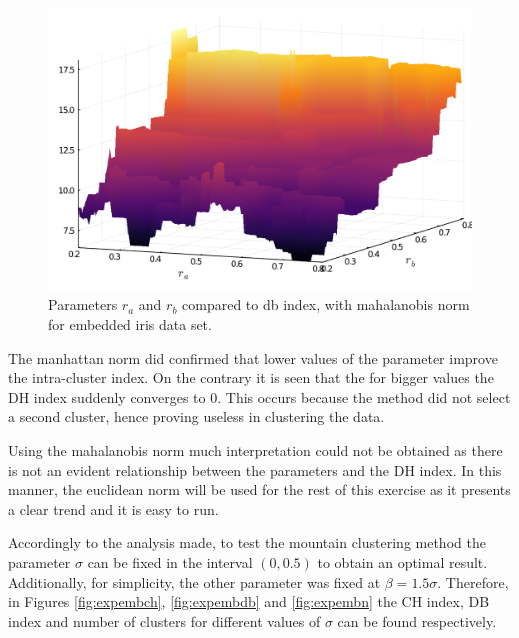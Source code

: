 \documentclass[conference]{IEEEtran}
\theoremstyle{definition}
\theoremstyle{remark}
\theoremstyle{remark}
\begin{document}
\begin{figure}[t]
  \centering
  \includegraphics[scale=.35]{figs/iris/exploring-3d-emb-mah}
  \caption{Parameters $r_{a}$ and $r_{b}$ compared to db index, with mahalanobis
    norm for embedded iris data set.}
  \label{fig:expemb3dmah}
\end{figure}

The manhattan norm did confirmed that lower values of the parameter improve the
intra-cluster index. On the contrary it is seen that the for bigger values the
DH index suddenly converges to 0. This occurs because the method did not select
a second cluster, hence proving useless in clustering the data.

Using the mahalanobis norm much interpretation could not be obtained as there is
not an evident relationship between the parameters and the DH index. In this
manner, the euclidean norm will be used for the rest of this exercise as it
presents a clear trend and it is easy to run.

Accordingly to the analysis made, to test the mountain clustering method the
parameter $\sigma$ can be fixed in the interval $(0, 0.5)$ to obtain an optimal
result. Additionally, for simplicity, the other parameter was fixed at
$\beta = 1.5\sigma$. Therefore, in Figures \ref{fig:expembch},
\ref{fig:expembdb} and \ref{fig:expembn} the CH index, DB index and number of
clusters for different values of $\sigma$ can be found respectively.
\end{document}
